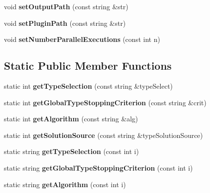 \begin{DoxyCompactItemize}
\item 
\mbox{\label{classConfiguration_ad9219c428519d263c1756b7455db69c3}} 
void {\bfseries set\+Output\+Path} (const string \&str)
\item 
\mbox{\label{classConfiguration_af1713fd04f9205a598c4f62ae61079e0}} 
void {\bfseries set\+Plugin\+Path} (const string \&str)
\item 
\mbox{\label{classConfiguration_aaa1ccb22a92f0f8e78a278da23fb7d7a}} 
void {\bfseries set\+Number\+Parallel\+Executions} (const int n)
\end{DoxyCompactItemize}
\subsection*{Static Public Member Functions}
\begin{DoxyCompactItemize}
\item 
\mbox{\label{classConfiguration_afcad41e321fc8da2336bfb19799ec885}} 
static int {\bfseries get\+Type\+Selection} (const string \&type\+Select)
\item 
\mbox{\label{classConfiguration_a4ad4a30c520caad9ec711cc53ecc000c}} 
static int {\bfseries get\+Global\+Type\+Stopping\+Criterion} (const string \&crit)
\item 
\mbox{\label{classConfiguration_a8837ce8e3718bdc22a4bb890a55c2afe}} 
static int {\bfseries get\+Algorithm} (const string \&alg)
\item 
\mbox{\label{classConfiguration_a0f5892ca12242ac4d3150907acffa0c7}} 
static int {\bfseries get\+Solution\+Source} (const string \&type\+Solution\+Source)
\item 
\mbox{\label{classConfiguration_a1f97d29adede2a859a5987aba1a6118d}} 
static string {\bfseries get\+Type\+Selection} (const int i)
\item 
\mbox{\label{classConfiguration_adc655ad7ecef80cf63a53656a138a196}} 
static string {\bfseries get\+Global\+Type\+Stopping\+Criterion} (const int i)
\item 
\mbox{\label{classConfiguration_a028c724371c7efe4af7ff6c6c3134ac1}} 
static string {\bfseries get\+Algorithm} (const int i)
\end{DoxyCompactItemize}
